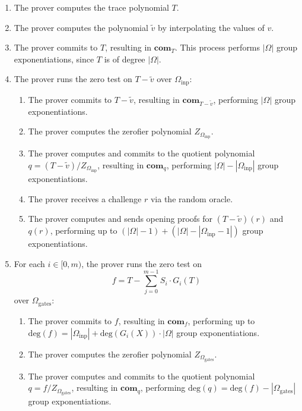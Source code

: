 \documentclass[11pt]{article}
\begin{document}
\begin{enumerate}
	\item The prover computes the trace polynomial $T$.
	\item The prover computes the polynomial $\widetilde{v}$ by interpolating the values of $v$.
	\item The prover commits to $T$, resulting in $\mathbf{com}_T$.
		This process performs $|\Omega|$ group exponentiations, since $T$ is of degree $|\Omega|$.
	\item The prover runs the zero test on $T - \widetilde{v}$ over $\Omega_{\text{inp}}$:
		\begin{enumerate}
			\item The prover commits to $T - \widetilde{v}$, resulting in $\mathbf{com}_{T - \widetilde{v}}$,
				performing $|\Omega|$ group exponentiations.
			\item The prover computes the zerofier polynomial $Z_{\Omega_{\text{inp}}}$.
			\item The prover computes and commits to the quotient polynomial
				$q = (T - \widetilde{v}) / Z_{\Omega_{\text{inp}}}$,
				resulting in $\mathbf{com}_q$, performing $|\Omega| - |\Omega_{\text{inp}}|$
				group exponentiations.
			\item The prover receives a challenge $r$ via the random oracle.
			\item The prover computes and sends opening proofs for $(T - \widetilde{v})(r)$ and $q(r)$,
				performing up to $(|\Omega| - 1) + (|\Omega| - |\Omega_{\text{inp}} - 1|)$
				group exponentiations.
		\end{enumerate}
	\item For each $i \in [0,m)$, the prover runs the zero test on
		\begin{equation}
			f = T - \sum_{j=0}^{m-1} S_i \cdot G_i(T)
		\end{equation}
		over $\Omega_{\text{gates}}$:
		\begin{enumerate}
			\item The prover commits to $f$, resulting in $\mathbf{com}_f$,
				performing up to $\text{deg}(f) = |\Omega_{\text{inp}}| + \text{deg}(G_i(X)) \cdot |\Omega|$
				group exponentiations.
			\item The prover computes the zerofier polynomial $Z_{\Omega_{\text{gates}}}$.
			\item The prover computes and commits to the quotient polynomial
				$q = f / Z_{\Omega_{\text{gates}}}$, resulting in $\mathbf{com}_q$,
				performing $\text{deg}(q) = \text{deg}(f) - |\Omega_{\text{gates}}|$ group exponentiations.

\end{enumerate}
\end{enumerate}
\end{document}

